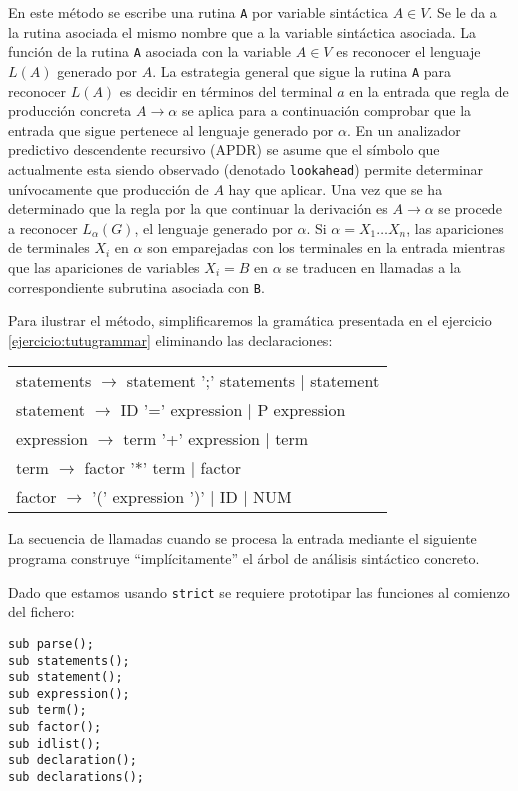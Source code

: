 En este método se escribe una rutina \verb|A| por variable sintáctica $A \in V$. 
Se le da a la rutina asociada el mismo nombre que a la variable sintáctica
asociada. La función de la rutina \verb|A| asociada con la variable
$A \in V$ es reconocer el lenguaje $L(A)$ generado por $A$.
La estrategia general que sigue la rutina \verb|A| para reconocer
$L(A)$ es decidir en términos del terminal $a$ en la entrada
que regla de producción concreta $A \rightarrow \alpha$ se aplica para
a continuación comprobar que la entrada que sigue pertenece al lenguaje generado por 
$\alpha$. 
En un analizador predictivo descendente recursivo (APDR) se asume que el símbolo que actualmente 
esta siendo observado (denotado \verb|lookahead|) permite determinar unívocamente
que producción de $A$ hay que aplicar. 
Una vez que se ha determinado que la regla por la que continuar la derivación
es $A \rightarrow \alpha$ se procede a reconocer $L_{\alpha}(G)$,
el lenguaje generado por $\alpha$. Si $\alpha = X_1 \ldots X_n$,
las apariciones de terminales $X_i$ en $\alpha$ son emparejadas
con los terminales en la entrada mientras que las apariciones de variables $X_i = B$
en $\alpha$ se traducen en llamadas a la correspondiente subrutina asociada con \verb|B|.

Para ilustrar el método,
simplificaremos la gramática presentada en el ejercicio
\ref{ejercicio:tutugrammar} eliminando las declaraciones:


\vspace{0.25cm}
\begin{tabular}{l}
statements   $\rightarrow$ statement  ';'  statements        $|$ statement\\
statement    $\rightarrow$ ID '=' expression                 $|$ P  expression\\
expression   $\rightarrow$ term '+' expression               $|$ term\\
term         $\rightarrow$ factor '*' term                   $|$ factor\\
factor       $\rightarrow$ '(' expression ')' $|$ ID $|$ NUM
\end{tabular}
\vspace{0.25cm}

La secuencia de llamadas cuando se procesa la entrada mediante 
el siguiente programa construye ``implícitamente'' el árbol 
de análisis sintáctico concreto.

Dado que estamos usando \verb|strict| se requiere prototipar las funciones
al comienzo del fichero:
\begin{verbatim}
sub parse();
sub statements();
sub statement();
sub expression();
sub term();
sub factor();
sub idlist();
sub declaration();
sub declarations();
\end{verbatim}

